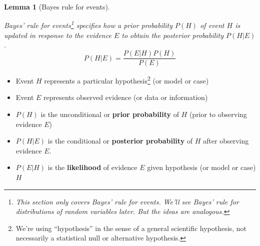 \documentclass[
  letterpaper,
  DIV=11,
  numbers=noendperiod]{scrreprt}
\providecommand{\tightlist}{%
  \setlength{\itemsep}{0pt}\setlength{\parskip}{0pt}}
\theoremstyle{plain}
\newtheorem{lemma}{Lemma}[chapter]
\theoremstyle{definition}
\theoremstyle{definition}
\theoremstyle{definition}
\theoremstyle{remark}
\begin{document}
\begin{table}

\caption{\label{tbl-bayes-rule-iterative-twoway}Two-way table for
Example~\ref{exm-bayes-rule-iterative-twoway}}


\end{table}%

\begin{lemma}[Bayes rule for
events]\protect\hypertarget{lem-bayes-rule}{}\label{lem-bayes-rule}

Bayes' rule for events\footnote{This section only covers Bayes' rule for
  events. We'll see Bayes' rule for distributions of random variables
  later. But the ideas are analogous.} specifies how a \emph{prior
probability} \(P(H)\) of event \(H\) is updated in response to the
evidence \(E\) to obtain the \emph{posterior probability} \(P(H|E)\). \[
P(H|E) = \frac{P(E|H)P(H)}{P(E)}
\]

\end{lemma}

\begin{itemize}
\tightlist
\item
  Event \(H\) represents a particular hypothesis\footnote{We're using
    ``hypothesis'' in the sense of a general scientific hypothesis, not
    necessarily a statistical null or alternative hypothesis.} (or model
  or case)
\item
  Event \(E\) represents observed evidence (or data or information)
\item
  \(P(H)\) is the unconditional or \textbf{prior probability} of \(H\)
  (prior to observing evidence \(E\))
\item
  \(P(H|E)\) is the conditional or \textbf{posterior probability} of
  \(H\) after observing evidence \(E\).
\item
  \(P(E|H)\) is the \textbf{likelihood} of evidence \(E\) given
  hypothesis (or model or case) \(H\)
\end{itemize}
\end{document}
